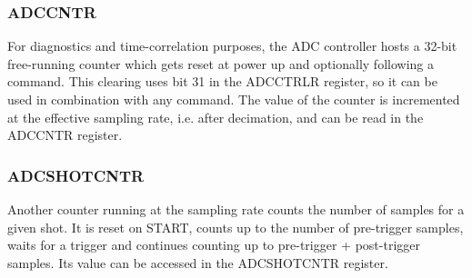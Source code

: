 \documentclass{article}
\begin{document}
\subsubsection{ADCCNTR}
\label{sssec:adccntr}
For diagnostics and time-correlation purposes, the ADC controller hosts a 32-bit free-running counter which gets reset at power up and optionally following a command. This clearing uses bit 31 in the ADCCTRLR register, so it can be used in combination with any command. The value of the counter is incremented at the effective sampling rate, i.e. after decimation, and can be read in the ADCCNTR register.   

\subsubsection{ADCSHOTCNTR}
Another counter running at the sampling rate counts the number of samples for a given shot. It is reset on START, counts up to the number of pre-trigger samples, waits for a trigger and continues counting up to pre-trigger + post-trigger samples. Its value can be accessed in the ADCSHOTCNTR register.
\end{document}
